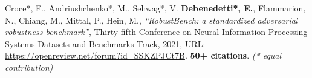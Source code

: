 




\begin{cvparagraph}
\vspace{5.0mm}
\begin{cvitems}
    \item Croce*, F., Andriushchenko*, M., Sehwag*, V. \textbf{Debenedetti*, E.}, Flammarion, N., Chiang, M., Mittal, P., Hein, M., \textit{``RobustBench: a standardized adversarial robustness benchmark''}, Thirty‑fifth Conference on Neural Information Processing Systems Datasets and Benchmarks Track, 2021, URL: \url{https://openreview.net/forum?id=SSKZPJCt7B}. \textbf{50+ citations}. \textit{(* equal contribution)}
\end{cvitems}
\end{cvparagraph}
\vspace{2.5mm}
